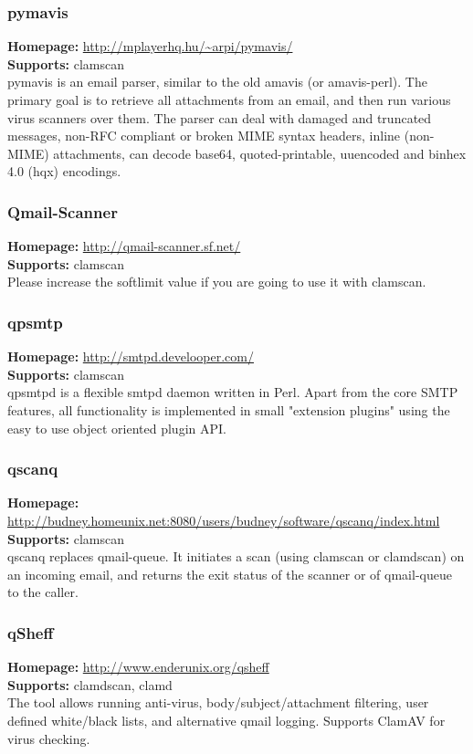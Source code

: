 \documentclass[a4paper,titlepage,12pt]{article}
\begin{document}
    \subsubsection{pymavis}
    \textbf{Homepage:} \url{http://mplayerhq.hu/~arpi/pymavis/}\\
    \textbf{Supports:} clamscan\\[4pt]
    pymavis is an email parser, similar to the old amavis (or amavis-perl). The
    primary goal is to retrieve all attachments from an email, and then run
    various virus scanners over them. The parser can deal with damaged and
    truncated messages, non-RFC compliant or broken MIME syntax headers,
    inline (non-MIME) attachments, can decode base64, quoted-printable,
    uuencoded and binhex 4.0 (hqx) encodings.

    \subsubsection{Qmail-Scanner}
    \textbf{Homepage:} \url{http://qmail-scanner.sf.net/}\\
    \textbf{Supports:} clamscan\\[4pt]
    Please increase the softlimit value if you are going to use it with
    clamscan.

    \subsubsection{qpsmtp}
    \textbf{Homepage:} \url{http://smtpd.develooper.com/}\\
    \textbf{Supports:} clamscan\\[4pt]
    qpsmtpd is a flexible smtpd daemon written in Perl. Apart from the core
    SMTP features, all functionality is implemented in small "extension plugins"
    using the easy to use object oriented plugin API.

    \subsubsection{qscanq}
    \textbf{Homepage:} \url{http://budney.homeunix.net:8080/users/budney/software/qscanq/index.html}\\
    \textbf{Supports:} clamscan\\[4pt]
    qscanq replaces qmail-queue. It initiates a scan (using clamscan or
    clamdscan) on an incoming email, and returns the exit status of the
    scanner or of qmail-queue to the caller.

    \subsubsection{qSheff}
    \textbf{Homepage:} \url{http://www.enderunix.org/qsheff}\\
    \textbf{Supports:} clamdscan, clamd\\[4pt]
    The tool allows running anti-virus, body/subject/attachment filtering, user 
    defined white/black lists, and alternative qmail logging. Supports ClamAV
    for virus checking.
\end{document}

